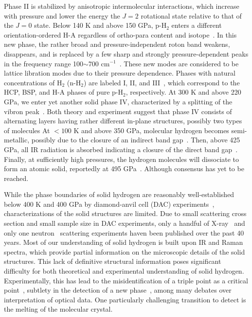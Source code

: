 Phase II is stabilized by anisotropic intermolecular interactions, which increase with pressure and lower the energy the $J=2$ rotational state relative to that of the $J=0$ state.
Below 140 K and above 150 GPa, p-H$_2$ enters a different orientation-ordered H-A regardless of ortho-para content and isotope~\cite{Cui1995,Goncharov1998}.
In this new phase, the rather broad and pressure-independent roton band weakens, disappears, and is replaced by a few sharp and strongly pressure-dependent peaks in the frequency range 100$\sim$700 cm$^{-1}$~\cite{Goncharov1998}.
These new modes are considered to be lattice libration modes due to their pressure dependence.
Phases with natural concentrations of H$_2$ (n-H$_2$) are labeled I, II, and III~\cite{Dias2019}, which correspond to the HCP, BSP, and H-A phases of pure p-H$_2$, respectively.
At 300 K and above 220 GPa, we enter yet another solid phase IV, characterized by a splitting of the vibron peak~\cite{Zha2013}.
Both theory and experiment suggest that phase IV consists of alternating layers having rather different in-plane structures, possibly two types of molecules
At $<100$ K and above 350 GPa, molecular hydrogen becomes semi-metallic, possibly due to the closure of an indirect band gap~\cite{Eremets2019}.
Then, above 425 GPa, all IR radiation is absorbed indicating a closure of the direct band gap~\cite{Loubeyre2020}.
Finally, at sufficiently high pressures, the hydrogen molecules will dissociate to form an atomic solid, reportedly at 495 GPa~\cite{Silvera2017}. Although consensus has yet to be reached.

While the phase boundaries of solid hydrogen are reasonably well-established below 400 K and 400 GPa by diamond-anvil cell (DAC) experiments~\cite{Dias2019}, characterizations of the solid structures are limited. Due to small scattering cross section and small sample size in DAC experiments, only a handful of X-ray~\cite{Hazen1987,MAO1988,Loubeyre1996,Kawamura2002,Goncharenko2005a,Akahama2010,Ji2019} and only one neutron~\cite{Goncharenko2005a} scattering experiments haven been published over the past 40 years. Most of our understanding of solid hydrogen is built upon IR and Raman spectra, which provide partial information on the microscopic details of the solid structures. This lack of definitive structural information poses significant difficulty for both theoretical and experimental understanding of solid hydrogen. Experimentally, this has lead to the misidentification of a triple point as a critical point~\cite{Lorenzana1990,Cui1994}, subtlety in the detection of a new phase~\cite{Eremets2009,Howie2012}, among many debates over interpretation of optical data. One particularly challenging transition to detect is the melting of the molecular crystal.

